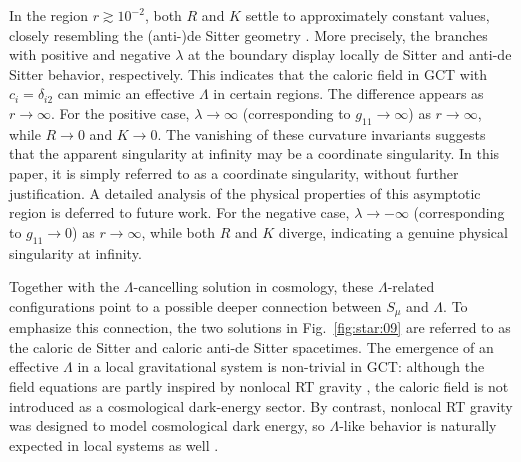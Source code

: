 \documentclass[aps,prd,twocolumn]{revtex4-2}
\begin{document}
In the region $r\gtrsim10^{-2}$, both $R$ and $K$ settle to approximately constant values, closely resembling the (anti-)de Sitter geometry \cite{Kim2002}. More precisely, the branches with positive and negative $\lambda$ at the boundary display locally de Sitter and anti-de Sitter behavior, respectively. This indicates that the caloric field in GCT with $c_i=\delta_{i2}$ can mimic an effective $\Lambda$ in certain regions. The difference appears as $r\rightarrow\infty$. For the positive case, $\lambda\rightarrow\infty$ (corresponding to $g_{11}\rightarrow\infty$) as $r\rightarrow\infty$, while $R\rightarrow0$ and $K\rightarrow0$. The vanishing of these curvature invariants suggests that the apparent singularity at infinity may be a coordinate singularity. In this paper, it is simply referred to as a coordinate singularity, without further justification. A detailed analysis of the physical properties of this asymptotic region is deferred to future work. For the negative case, $\lambda\rightarrow-\infty$ (corresponding to $g_{11}\rightarrow0$) as $r\rightarrow\infty$, while both $R$ and $K$ diverge, indicating a genuine physical singularity at infinity. 

Together with the $\Lambda$-cancelling solution in cosmology, these $\Lambda$-related configurations point to a possible deeper connection between $S_\mu$ and $\Lambda$. To emphasize this connection, the two solutions in Fig.~\ref{fig:star:09} are referred to as the caloric de Sitter and caloric anti-de Sitter spacetimes. The emergence of an effective $\Lambda$ in a local gravitational system is non-trivial in GCT: although the field equations are partly inspired by nonlocal RT gravity \cite{Maggiore2014.PRD.89.043008}, the caloric field is not introduced as a cosmological dark-energy sector. By contrast, nonlocal RT gravity was designed to model cosmological dark energy, so $\Lambda$-like behavior is naturally expected in local systems as well \cite{Kehagias2014.JHighEnergyPhys.08.029}. 
\end{document}
